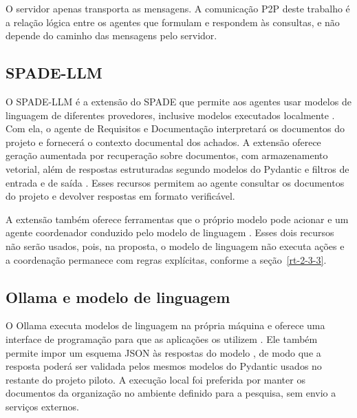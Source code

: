 O servidor apenas transporta as mensagens. A comunicação P2P deste trabalho é a relação lógica entre os agentes que formulam e respondem às consultas, e não depende do caminho das mensagens pelo servidor.

\subsection{SPADE-LLM}
\label{st-spade-llm}

O SPADE-LLM é a extensão do SPADE que permite aos agentes usar modelos de linguagem de diferentes provedores, inclusive modelos executados localmente \cite{spadeLlmPlugin,spadeLlmPypi}. Com ela, o agente de Requisitos e Documentação interpretará os documentos do projeto e fornecerá o contexto documental dos achados. A extensão oferece geração aumentada por recuperação sobre documentos, com armazenamento vetorial, além de respostas estruturadas segundo modelos do Pydantic e filtros de entrada e de saída \cite{spadeLlmPypi}. Esses recursos permitem ao agente consultar os documentos do projeto e devolver respostas em formato verificável.

A extensão também oferece ferramentas que o próprio modelo pode acionar e um agente coordenador conduzido pelo modelo de linguagem \cite{spadeLlmPypi}. Esses dois recursos não serão usados, pois, na proposta, o modelo de linguagem não executa ações e a coordenação permanece com regras explícitas, conforme a seção~\ref{rt-2-3-3}.

\subsection{Ollama e modelo de linguagem}
\label{st-ollama}

O Ollama executa modelos de linguagem na própria máquina e oferece uma interface de programação para que as aplicações os utilizem \cite{ollamaApi}. Ele também permite impor um esquema JSON às respostas do modelo \cite{ollamaStructured}, de modo que a resposta poderá ser validada pelos mesmos modelos do Pydantic usados no restante do projeto piloto. A execução local foi preferida por manter os documentos da organização no ambiente definido para a pesquisa, sem envio a serviços externos.

